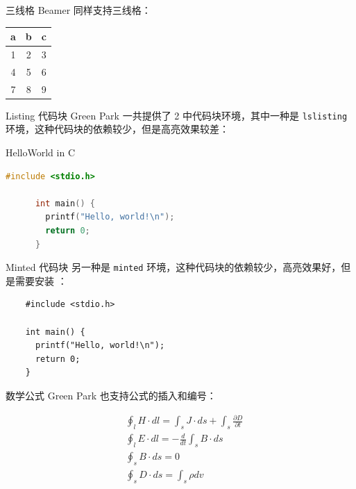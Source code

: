 \documentclass{ctexbeamer}
\begin{document}
\begin{frame}{三线格}
  Beamer 同样支持三线格：
  
  \begin{table}[h]
    \centering
    \begin{tabular}{ccc}
      \toprule 
      a & b  &  c \\ 
      \midrule 
      1 & 2 & 3 \\
      4 & 5 & 6 \\
      7 & 8 & 9 \\
      \bottomrule 
    \end{tabular}
  \end{table}
\end{frame}

\begin{frame}[fragile]{Listing 代码块}
  Green Park 一共提供了 2 中代码块环境，其中一种是 \texttt{lslisting} 环境，这种代码块的依赖较少，但是高亮效果较差：
  
  \begin{block}{HelloWorld in C}
    \begin{lstlisting}[language=c]  
      #include <stdio.h>

      int main() {
        printf("Hello, world!\n");
        return 0;
      }
    \end{lstlisting}
  \end{block}

\end{frame}

\begin{frame}[fragile]{Minted 代码块}
  另一种是 \texttt{minted} 环境，这种代码块的依赖较少，高亮效果好，但是需要安装 ：
  \begin{verbatim}
    #include <stdio.h>

    int main() {
      printf("Hello, world!\n");
      return 0;
    }
  \end{verbatim}

\end{frame}

\begin{frame}{数学公式}
  Green Park 也支持公式的插入和编号：
  
  \begin{align}
    &\oint_{l} H \cdot dl=\int_{s}J\cdot ds+ \int_{s} \frac {\partial D} {\partial t} \\
    &\oint_{l} E \cdot dl=-\frac {d}{dt}\int_{s}B\cdot ds \\
    &\oint_{s}B\cdot ds=0 \\
    &\oint_{s}D\cdot ds=\int_{s}\rho dv
  \end{align}
\end{frame}
\end{document}

